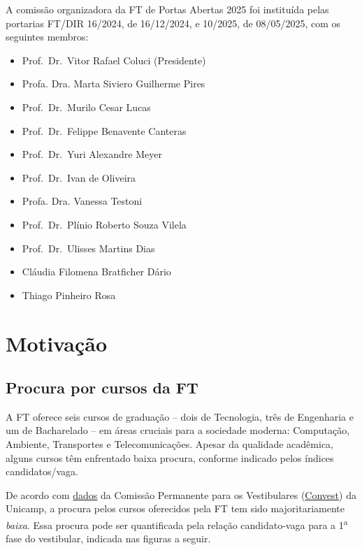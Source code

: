 \documentclass[
  letterpaper,
  DIV=11,
  numbers=noendperiod]{scrreprt}
\begin{document}
A comissão organizadora da FT de Portas Abertas 2025 foi instituída
pelas portarias FT/DIR 16/2024, de 16/12/2024, e 10/2025, de 08/05/2025,
com os seguintes membros:

\begin{itemize}
\item
  Prof.~Dr.~Vitor Rafael Coluci (Presidente)
\item
  Profa. Dra. Marta Siviero Guilherme Pires
\item
  Prof.~Dr.~Murilo Cesar Lucas
\item
  Prof.~Dr.~Felippe Benavente Canteras
\item
  Prof.~Dr.~Yuri Alexandre Meyer
\item
  Prof.~Dr.~Ivan de Oliveira
\item
  Profa. Dra. Vanessa Testoni
\item
  Prof.~Dr.~Plínio Roberto Souza Vilela
\item
  Prof.~Dr.~Ulisses Martins Dias
\item
  Cláudia Filomena Bratficher Dário
\item
  Thiago Pinheiro Rosa
\end{itemize}

\chapter{Motivação}\label{motivauxe7uxe3o}

\section{Procura por cursos da FT}\label{procura-por-cursos-da-ft}

A FT oferece seis cursos de graduação -- dois de Tecnologia, três de
Engenharia e um de Bacharelado -- em áreas cruciais para a sociedade
moderna: Computação, Ambiente, Transportes e Telecomunicações. Apesar da
qualidade acadêmica, alguns cursos têm enfrentado baixa procura,
conforme indicado pelos índices candidatos/vaga.

De acordo com
\href{https://www.comvest.unicamp.br/base-de-dados-comvest/vestibulares/vestibulares-anteriores/}{dados}
da Comissão Permanente para os Vestibulares
(\href{https://www.comvest.unicamp.br/}{Convest}) da Unicamp, a procura
pelos cursos oferecidos pela FT tem sido majoritariamente \emph{baixa}.
Essa procura pode ser quantificada pela relação candidato-vaga para a
1\textsuperscript{a} fase do vestibular, indicada nas figuras a seguir.
\end{document}

